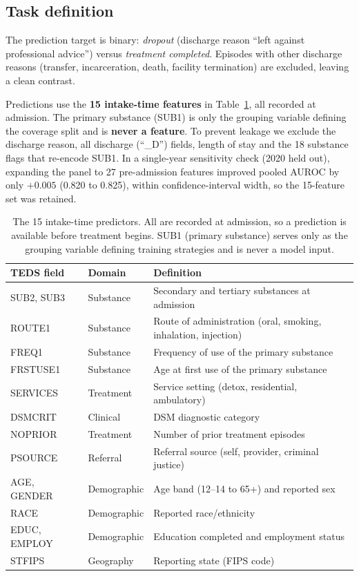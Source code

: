 \documentclass[conference]{IEEEtran}
\begin{document}
\subsection{Task definition}
The prediction target is binary: \emph{dropout} (discharge reason ``left against professional
advice'') versus \emph{treatment completed}. Episodes with other discharge reasons (transfer,
incarceration, death, facility termination) are excluded, leaving a clean contrast.

Predictions use the \textbf{15 intake-time features} in Table~\ref{tab:features}, all recorded at
admission. The primary substance (SUB1) is only the grouping variable defining the coverage split
and is \textbf{never a feature}. To prevent leakage we exclude the discharge reason, all discharge (``\_D'')
fields, length of stay and the 18 substance flags that re-encode SUB1. In a single-year sensitivity check (2020 held out), expanding the panel to 27 pre-admission
features improved pooled AUROC by only $+0.005$ (0.820 to 0.825), within confidence-interval
width, so the 15-feature set was retained.

\begin{table}[t]
\caption{The 15 intake-time predictors. All are recorded at admission, so a prediction is
available before treatment begins. SUB1 (primary substance) serves only as the grouping
variable defining training strategies and is never a model input.}
\label{tab:features}
\centering
\scriptsize
\setlength{\tabcolsep}{3pt}
\begin{tabular}{@{}llp{}@{}}
\toprule
TEDS field & Domain & Definition \\
\midrule
SUB2, SUB3 & Substance & Secondary and tertiary substances at admission \\
ROUTE1 & Substance & Route of administration (oral, smoking, inhalation, injection) \\
FREQ1 & Substance & Frequency of use of the primary substance \\
FRSTUSE1 & Substance & Age at first use of the primary substance \\
SERVICES & Treatment & Service setting (detox, residential, ambulatory) \\
DSMCRIT & Clinical & DSM diagnostic category \\
NOPRIOR & Treatment & Number of prior treatment episodes \\
PSOURCE & Referral & Referral source (self, provider, criminal justice) \\
AGE, GENDER & Demographic & Age band (12--14 to 65+) and reported sex \\
RACE & Demographic & Reported race/ethnicity \\
EDUC, EMPLOY & Demographic & Education completed and employment status \\
STFIPS & Geography & Reporting state (FIPS code) \\
\bottomrule
\end{tabular}
\end{table}
\end{document}
